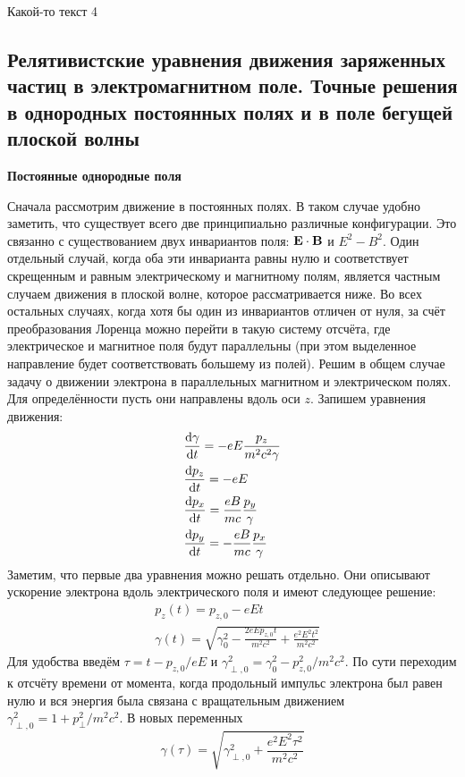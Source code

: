 \documentclass[10pt, a4paper]{article}
\begin{document}
Какой-то текст 4

\subsection{Релятивистские уравнения движения заряженных частиц в электромагнитном поле. Точные решения в однородных постоянных полях и в поле бегущей плоской волны}

\textbf{Постоянные однородные поля}

Сначала рассмотрим движение в постоянных полях. В таком случае удобно заметить, что существует всего две принципиально различные конфигурации. Это связанно с существованием двух инвариантов поля: $\vb{E}\cdot\vb{B}$ и $E^2 - B^2$. Один отдельный случай, когда оба эти инварианта равны нулю и соответствует скрещенным и равным электрическому и магнитному полям, является частным случаем движения в плоской волне, которое рассматривается ниже. Во всех остальных случаях, когда хотя бы один из инвариантов отличен от нуля, за счёт преобразования Лоренца можно перейти в такую систему отсчёта, где электрическое и магнитное поля будут параллельны (при этом выделенное направление будет соответствовать большему из полей). Решим в общем случае задачу о движении электрона в параллельных магнитном и электрическом полях. Для определённости пусть они направлены вдоль оси $z$. Запишем уравнения движения:
\begin{align*}
	& \dv{\gamma}{t} = -eE\frac{p_z}{m^2c^2\gamma} \\
	& \dv{p_z}{t} = -eE \\
	& \dv{p_x}{t} = \frac{eB}{mc}\frac{p_y}{\gamma} \\
	& \dv{p_y}{t} = -\frac{eB}{mc}\frac{p_x}{\gamma} \\
\end{align*}
Заметим, что первые два уравнения можно решать отдельно. Они описывают ускорение электрона вдоль электрического поля и имеют следующее решение:
\begin{align*}
	& p_z(t) = p_{z,0} - eEt \\
	& \gamma(t) = \sqrt{\gamma_0^2 - \frac{2eEp_{z,0}t}{m^2c^2} + \frac{e^2E^2t^2}{m^2c^2} }
\end{align*}
Для удобства введём $\tau = t - p_{z,0}/eE$ и $\gamma_{\perp,0}^2 = \gamma_0^2 - p_{z,0}^2/m^2c^2$. По сути переходим к отсчёту времени от момента, когда продольный импульс электрона был равен нулю и вся энергия была связана с вращательным движением $\gamma_{\perp,0}^2 = 1 + p_{\perp}^2/m^2c^2$. В новых переменных
\begin{equation*}
	\gamma(\tau) = \sqrt{\gamma_{\perp, 0}^2 + \frac{e^2E^2\tau^2}{m^2c^2} }
\end{equation*}
\end{document}
